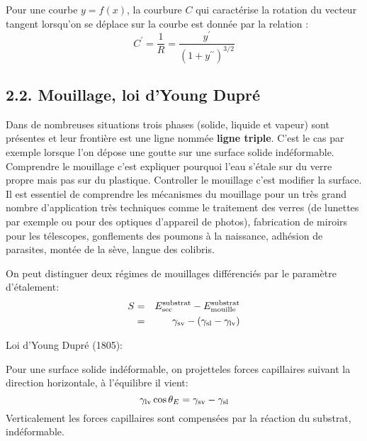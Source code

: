 \documentclass[french, a4paper, 10pt, twocolumn, landscape]{article}
\begin{document}
Pour une courbe $y = f (x)$, la courbure $C$ qui caract{\'e}rise la rotation du vecteur tangent lorsqu'on se d{\'e}place sur la courbe est donn{\'e}e par la relation :
\begin{equation} 
  C^\prime = \dfrac{1}{R} = \dfrac{y^\prime}{(1 + y^{\prime\prime})^{3 /  2}} 
\end{equation}


\subsection*{2.2. Mouillage, loi d'Young Dupr{\'e}}

Dans de nombreuses situations trois phases (solide, liquide et vapeur) sont
pr{\'e}sentes et leur fronti{\`e}re est une ligne nomm{\'e}e \textbf{ligne
triple}. C'est le cas par exemple lorsque l'on d{\'e}pose une goutte sur une
surface solide ind{\'e}formable. Comprendre le mouillage c'est expliquer
pourquoi l'eau s'{\'e}tale sur du verre propre mais pas sur du plastique.
Controller le mouillage c'est modifier la surface. Il est essentiel de
comprendre les m{\'e}canismes du mouillage pour un tr{\`e}s grand nombre
d'application tr{\`e}s techniques comme le traitement des verres (de lunettes
par exemple ou pour des optiques d'appareil de photos), fabrication de miroirs
pour les t{\'e}lescopes, gonflements des poumons {\`a} la naissance,
adh{\'e}sion de parasites, mont{\'e}e de la s{\`e}ve, langue des colibris.\medskip

On peut distinguer deux r{\'e}gimes de mouillages diff{\'e}renci{\'e}s par le
param{\`e}tre d'{\'e}talement:
\begin{eqnarray}
  S &=& E_{\rm sec}^{\rm substrat} - E_{\rm mouille}^{\rm substrat} \nonumber\\
  &=& \gamma_{\rm sv} - (\gamma_{\rm sl} - \gamma_{\rm lv}) 
\end{eqnarray}
\begin{definition}{Loi d'Young Dupr{\'e} (1805):}

  Pour une surface solide ind{\'e}formable, on projetteles forces capillaires
  suivant la direction horizontale, {\`a} l'{\'e}quilibre il vient:
  \begin{equation} 
    \gamma_{\rm lv} \cos \theta_E = \gamma_{\rm sv} -   \gamma_{\rm sl} 
  \end{equation}
  Verticalement les forces capillaires sont compens{\'e}es par la r{\'e}action
  du substrat, ind{\'e}formable.
\end{definition}
\end{document}
